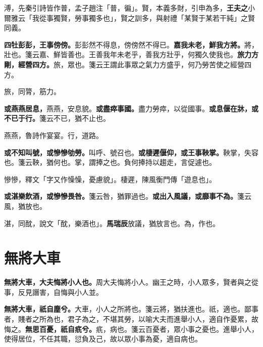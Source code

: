 \begin{quoting}溥，先秦引詩皆作普，孟子趙注「普，徧」。賢，本義多財，引申為多，\textbf{王夫之}小爾雅云「我從事獨賢，勞事獨多也」，賢之訓多，與射禮「某賢于某若干純」之賢同義。\end{quoting}

\textbf{四牡彭彭，王事傍傍。}{\footnotesize 彭彭然不得息，傍傍然不得已。}\textbf{嘉我未老，鮮我方將。}{\footnotesize 將，壯也。箋云嘉、鮮皆善也。王善我年未老乎，善我方壯乎，何獨久使我也。}\textbf{旅力方剛，經營四方。}{\footnotesize 旅，眾也。箋云王謂此事眾之氣力方盛乎，何乃勞苦使之經營四方。}

\begin{quoting}旅，同膂，筋力。\end{quoting}

\textbf{或燕燕居息，}{\footnotesize 燕燕，安息貌。}\textbf{或盡瘁事國。}{\footnotesize 盡力勞瘁，以從國事。}\textbf{或息偃在牀，或不已于行。}{\footnotesize 箋云不已，猶不止也。}

\begin{quoting}燕燕，魯詩作宴宴。行，道路。\end{quoting}

\textbf{或不知叫號，或慘慘劬勞。}{\footnotesize 叫呼、號召也。}\textbf{或棲遲偃仰，或王事鞅掌。}{\footnotesize 鞅掌，失容也。箋云鞅，猶何也。掌，謂捧之也。負何捧持以趨走，言促遽也。}

\begin{quoting}慘慘，釋文「字又作懆懆，憂慮貌」。棲遲，陳風衡門傳「遊息也」。\end{quoting}

\textbf{或湛樂飲酒，或慘慘畏咎。}{\footnotesize 箋云咎，猶罪過也。}\textbf{或出入風議，或靡事不為。}{\footnotesize 箋云風，猶放也。}

\begin{quoting}湛，同酖，說文「酖，樂酒也」。\textbf{馬瑞辰}放議，猶放言也。為，作也。\end{quoting}

\section{無將大車}


\textbf{無將大車，大夫悔將小人也。}{\footnotesize 周大夫悔將小人。幽王之時，小人眾多，賢者與之從事，反見譖害，自悔與小人並。}

\textbf{無將大車，祇自塵兮。}{\footnotesize 大車，小人之所將也。箋云將，猶扶進也。祇，適也。鄙事者，賤者之所為也，君子為之，不堪其勞，以喻大夫而進舉小人，適自作憂累，故悔之。}\textbf{無思百憂，祇自疧兮。}{\footnotesize 疧，病也。箋云百憂者，眾小事之憂也。進舉小人，使得居位，不任其職，愆負及己，故以眾小事為憂，適自病也。}

